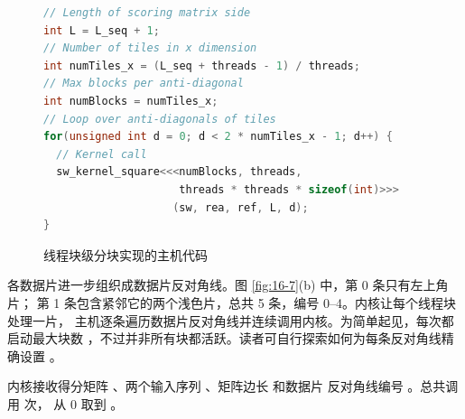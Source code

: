 \begin{figure}[htbp]
  \centering
  \begin{minipage}{0.94\textwidth}
  \begin{lstlisting}[language=C++,basicstyle=\ttfamily\scriptsize]
// Length of scoring matrix side
int L = L_seq + 1;
// Number of tiles in x dimension
int numTiles_x = (L_seq + threads - 1) / threads;
// Max blocks per anti-diagonal
int numBlocks = numTiles_x;
// Loop over anti-diagonals of tiles
for(unsigned int d = 0; d < 2 * numTiles_x - 1; d++) {
  // Kernel call
  sw_kernel_square<<<numBlocks, threads,
                     threads * threads * sizeof(int)>>>
                    (sw, rea, ref, L, d);
}
  \end{lstlisting}
  \end{minipage}
  \caption{线程块级分块实现的主机代码}
  \label{fig:16-8}
\end{figure}

各数据片进一步组织成数据片反对角线。图 \ref{fig:16-7}(b) 中，第 0 条只有左上角片；
第 1 条包含紧邻它的两个浅色片，总共 5 条，编号 0--4。内核让每个线程块处理一片，
主机逐条遍历数据片反对角线并连续调用内核。为简单起见，每次都启动最大块数
，不过并非所有块都活跃。读者可自行探索如何为每条反对角线精确设置
。

内核接收得分矩阵 、两个输入序列 、矩阵边长  和数据片
反对角线编号 。总共调用  次， 从 0 取到
。

